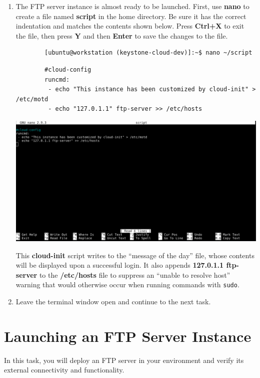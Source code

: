 \documentclass[letterpaper, 12pt]{article}
\begin{document}
\begin{enumerate}
    \item The FTP server instance is almost ready to be launched.
    First, use \textbf{nano} to create a file named \textbf{script} in the home directory.
    Be sure it has the correct indentation and matches the contents shown below.
    Press \textbf{Ctrl+X} to exit the file, then press \textbf{Y} and then \textbf{Enter} to save the changes to the file.
    \begin{lstlisting}
        [ubuntu@workstation (keystone-cloud-dev)]:~$ nano ~/script
    \end{lstlisting}
    \begin{lstlisting}
        #cloud-config
        runcmd:
         - echo "This instance has been customized by cloud-init" > /etc/motd
         - echo "127.0.1.1" ftp-server >> /etc/hosts
    \end{lstlisting}

    \begin{center}
        \includegraphics[width=\linewidth]{images/part1/step37.png}
    \end{center}

    \begin{notebox}
        This \textbf{cloud-init} script writes to the ``message of the day'' file, whose contents will be displayed upon a successful login.
        It also appends \textbf{127.0.1.1 ftp-server} to the \textbf{/etc/hosts} file to suppress an ``unable to resolve host'' warning that would otherwise occur when running commands with \texttt{sudo}.
    \end{notebox}

    \item Leave the terminal window open and continue to the next task.
\end{enumerate}

\section{Launching an FTP Server Instance}
\label{sec:launch_an_ftp_server_instance}
In this task, you will deploy an FTP server in your environment and verify its external connectivity and functionality.
\end{document}

